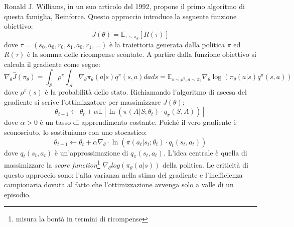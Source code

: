 Ronald J. Williams, in un suo articolo \cite{williams1992simple} del 1992, propone il primo algoritmo di questa famiglia, Reinforce. Questo approccio introduce la seguente funzione obiettivo:
\begin{equation}
    J(\theta)= \mathbb{E}_{\tau\sim \pi_\theta}[R(\tau)]
\end{equation}
dove $\tau= (s_0,a_0,r_0,s_1,a_0,r_1,...)$ è la traiettoria generata dalla politica $\pi$ ed $R(\tau)$ è la somma delle ricompense scontate. A partire dalla funzione obiettivo si calcola il gradiente come segue:
\begin{equation}
    \nabla_\theta \hat{J}(\pi_\theta) = \int_\mathcal{S} \rho^\pi \int_\mathcal{A} \nabla_\theta \pi_\theta(a|s) q^\pi(s,a) da ds
    =\mathbb{E}_{s\sim\rho^\pi,a\sim\pi_\theta}{\nabla_\theta \log (\pi_\theta(a|s)q^\pi(s,a))}
\end{equation}
dove $\rho^\pi(s)$ è la probabilità dello stato. Richiamando l'algoritmo di ascesa del gradiente si scrive l'ottimizzatore per massimizzare $J(\theta)$:
\begin{equation}\theta_{t+1}\xleftarrow{} \theta_t+\alpha\mathbb{E}[\ln(\pi(A|S;\theta_t)\cdot q_\pi(S,A))]\end{equation}
dove $\alpha > 0$ è un tasso di apprendimento costante. Poiché il vero gradiente è sconosciuto, lo sostituiamo con uno stocastico:
\begin{equation}\theta_{t+1} \xleftarrow{}\theta_t+\alpha \nabla_\theta \cdot \ln(\pi(a_t|s_t;\theta_t)\cdot q_t(s_t,a_t))\end{equation}
dove $q_t(s_t,a_t)$ è un'approssimazione di $q_\pi(s_t,a_t)$. L'idea centrale è quella di massimizzare la \textit{score function}\footnote{misura la bontà in termini di ricompense} $\nabla_\theta log(\pi_\theta(a|s))$ della politica. Le criticità di questo approccio sono: l'alta varianza nella stima del gradiente e l'inefficienza campionaria dovuta al fatto che l'ottimizzazione avvenga solo a valle di un episodio.


